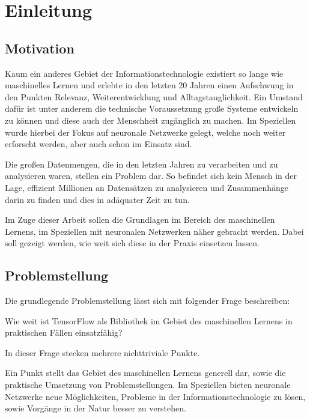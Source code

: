 \chapter{Einleitung}
\label{cha:Einleitung}

\section{Motivation}

Kaum ein anderes Gebiet der Informationstechnologie existiert so lange wie maschinelles Lernen und erlebte in den letzten 20 Jahren einen Aufschwung in den Punkten Relevanz, Weiterentwicklung und Alltagstauglichkeit. 
Ein Umstand dafür ist unter anderem die technische Voraussetzung große Systeme entwickeln zu können und diese auch der Menschheit zugänglich zu machen. 
Im Speziellen wurde hierbei der Fokus auf neuronale Netzwerke gelegt, welche noch weiter erforscht werden, aber auch schon im Einsatz sind. \newline

\noindent
Die großen Datenmengen, die in den letzten Jahren zu verarbeiten und zu analysieren waren, stellen ein Problem dar. 
So befindet sich kein Mensch in der Lage, effizient Millionen an Datensätzen zu analysieren und Zusammenhänge darin zu finden und dies in adäquater Zeit zu tun. \newline

\noindent
Im Zuge dieser Arbeit sollen die Grundlagen im Bereich des maschinellen Lernens, im Speziellen mit neuronalen Netzwerken näher gebracht werden. 
Dabei soll gezeigt werden, wie weit sich diese in der Praxis einsetzen lassen. 

\section{Problemstellung}

Die grundlegende Problemstellung lässt sich mit folgender Frage beschreiben: \newline

Wie weit ist TensorFlow als Bibliothek im Gebiet des maschinellen Lernens in praktischen Fällen einsatzfähig? \newline

\noindent
In dieser Frage stecken mehrere nichttriviale Punkte. 

\noindent
Ein Punkt stellt das Gebiet des maschinellen Lernens generell dar, sowie die praktische Umsetzung von Problemstellungen. 
Im Speziellen bieten neuronale Netzwerke neue Möglichkeiten, Probleme in der Informationstechnologie zu lösen, sowie Vorgänge in der Natur besser zu verstehen. \newline

